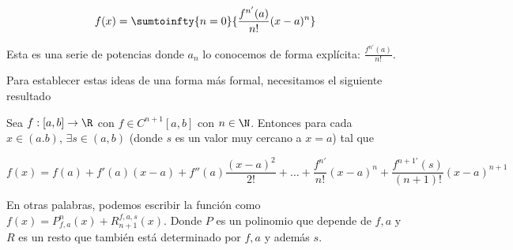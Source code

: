 \[
f(x) = \sumtoinfty{n=0}{\frac{f^{n'}(a)}{n!} (x-a)^n}
\]

Esta es una serie de potencias donde $a_n$ lo conocemos de forma explícita: $\frac{f^{n'}(a)}{n!}$.

Para establecer estas ideas de una forma más formal, necesitamos el siguiente resultado

\begin{teo}
    Sea $f: [a,b] \rightarrow \R$ con $f \in C^{n+1}[a,b]$ con $n \in \N$. Entonces para cada $x \in (a.b)$, $\exists s \in (a,b)$ (donde $s$ es un valor muy cercano a $x = a$) tal que
    
    \[
    f(x) = f(a) + f'(a)(x-a) + f''(a) \frac{(x-a)^2}{2!} + \dots + \frac{f^{n'}}{n!}(x-a)^n + \frac{f^{n+1'}(s)}{(n+1)!}(x-a)^{n+1}
    \]
    
    En otras palabras, podemos escribir la función como $f(x) = P_{f,a}^n (x) + R_{n+1}^{f,a,s} (x)$. Donde $P$ es un polinomio que depende de $f, a$ y $R$ es un resto que también está determinado por $f,a$ y además $s$.
\end{teo}

